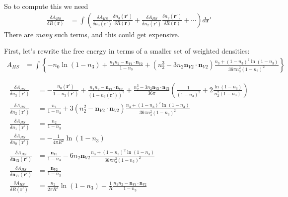 \documentclass[letterpaper,twocolumn,amsmath,amssymb,prb]{revtex4-1}
\newcommand{\derivation}[1]{#1} %
\begin{document}
\derivation{
  So to compute this we need
  \begin{align}
    \frac{\delta A_{HS}}{\delta R(\mathbf{r})} &=
    \int \left(
    \frac{\delta A_{HS}}{\delta n_3(\mathbf{r}')}
    \frac{\delta n_3(\mathbf{r}')}{\delta R(\mathbf{r})}
    +
    \frac{\delta A_{HS}}{\delta n_2(\mathbf{r}')}
    \frac{\delta n_2(\mathbf{r}')}{\delta R(\mathbf{r})}
    + \cdots
    \right) d\mathbf{r}'
  \end{align}
  There are \emph{many} such terms, and this could get expensive.
  
  First, let's rewrite the free energy in terms of a smaller set of
  weighted densities:
  \begin{align}
    A_{HS} &= \int \left\{
    -n_0 \ln\left( 1 - n_3\right)
    + \frac{n_1 n_2 - \mathbf{n}_{V1} \cdot\mathbf{n}_{V2}}{1-n_3}
    + (n_2^3 - 3 n_2 \mathbf{n}_{V2} \cdot \mathbf{n}_{V2}) \frac{
      n_3 + (1-n_3)^2 \ln(1-n_3)
    }{
      36\pi n_3^2(1-n_3)^2
    }
    \right\}
  \end{align}
  
  \begin{align}
    \frac{\delta A_{HS}}{\delta n_3(\mathbf{r}')} &=
    -\frac{n_0(\mathbf{r}')}{1 - n_3(\mathbf{r}')}
    + \frac{n_1n_2 - \mathbf{n}_{V1}\cdot\mathbf{n}_{V2}}{(1 -
      n_3(\mathbf{r}'))^2}
    + \frac{n_2^3 -
      3n_2\mathbf{n}_{V2}\cdot\mathbf{n}_{V2}}{36\pi}\left(
    \frac{1}{(1-n_3)^2} + 2\frac{\ln(1-n_3)}{n_2^2(1-n_3)}
    \right)
    \\
    \frac{\delta A_{HS}}{\delta n_2(\mathbf{r}')} &=
    \frac{n_1}{1-n_3}
    + 3(n_2^2 - \mathbf{n}_{V2}\cdot\mathbf{n}_{V2})\frac{n_3 +
      (1-n_3)^2\ln(1-n_3)}{
      36\pi n_3^2(1-n_3)^2
    }
    \\
    \frac{\delta A_{HS}}{\delta n_1(\mathbf{r}')} &= \frac{n_2}{1-n_3}
    \\
    \frac{\delta A_{HS}}{\delta n_0(\mathbf{r}')} &=
    -\frac{1}{4\pi R^2} \ln\left( 1 - n_3\right) \\
    \frac{\delta A_{HS}}{\delta \mathbf{n}_{V2}(\mathbf{r}')} &=
    \frac{\mathbf{n}_{V1}}{1-n_3}
    - 6 n_2 \mathbf{n}_{V2} \frac{n_3 +
      (1-n_3)^2\ln(1-n_3)}{
      36\pi n_3^2(1-n_3)^2
    }    \\
    \frac{\delta A_{HS}}{\delta \mathbf{n}_{V1}(\mathbf{r}')} &=
    \frac{\mathbf{n}_{V2}}{1-n_3} \\
    \frac{\delta A_{HS}}{\delta R(\mathbf{r}')} &=
    \frac{n_2}{2\pi R^3} \ln\left( 1 - n_3\right)
    - \frac1{R} \frac{n_1n_2 - \mathbf{n}_{V1} \cdot\mathbf{n}_{V2}}{1-n_3}
  \end{align}
  
}
\end{document}
